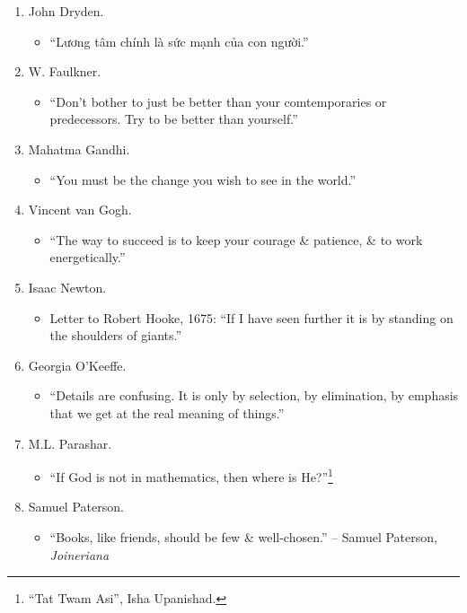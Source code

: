 \documentclass{article}
\begin{document}
\begin{enumerate}
\begin{itemize}
		\item ``1 đứa trẻ kiêu căng, tự phụ hoặc 1 đứa trẻ tự ti, sợ hãi không phải là mục tiêu giáo dục của chúng ta.''
	\end{itemize}
	\item {\sc John Dryden.}
	\begin{itemize}
		\item ``Lương tâm chính là sức mạnh của con người.''
	\end{itemize}
	\item {\sc W. Faulkner.}
	\begin{itemize}
		\item ``Don't bother to just be better than your comtemporaries or predecessors. Try to be better than yourself.''
	\end{itemize}
	\item {\sc Mahatma Gandhi.}
	\begin{itemize}
		\item ``You must be the change you wish to see in the world.''
	\end{itemize}
	\item {\sc Vincent van Gogh.}
	\begin{itemize}
		\item ``The way to succeed is to keep your courage \& patience, \& to work energetically.''
	\end{itemize}
	\item {\sc Isaac Newton.}
	\begin{itemize}
		\item Letter to Robert Hooke, 1675: ``If I have seen further it is by standing on the shoulders of giants.''
	\end{itemize}	
	\item {\sc Georgia O'Keeffe.}
	\begin{itemize}
		\item ``Details are confusing. It is only by selection, by elimination, by emphasis that we get at the real meaning of things.''
	\end{itemize}
	\item {\sc M.L. Parashar.}
	\begin{itemize}
		\item ``If God is not in mathematics, then where is He?''\footnote{``Tat Twam Asi'', Isha Upanishad.}
	\end{itemize}
	\item {\sc Samuel Paterson.}
	\begin{itemize}
		\item ``Books, like friends, should be few \& well-chosen.'' -- Samuel Paterson, {\it Joineriana}

\end{itemize}
\end{enumerate}
\end{document}

